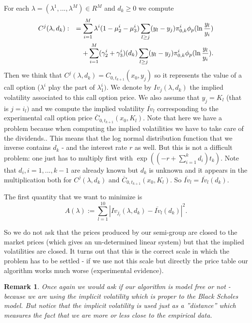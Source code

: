 \documentclass[a4paper]{article}
\newtheorem{remark}{Remark}[section]
\begin{document}
For each $\lambda =(\lambda ^{1},...,\lambda ^{M})\in R^{M}$ and $d_{k}\geq
0 $ we compute
\begin{eqnarray*}
C^{j}(\lambda ,d_{k}) &:&=\sum_{i=1}^{M}\lambda ^{i}(1-\mu _{2}^{i}-\mu
_{3}^{i})\sum_{l\geq j}(y_{l}-y_{j})\pi _{0,k}^{i}\phi _{p}(\ln \frac{y_{l}}{%
y_{i}}) \\
&&+\sum_{i=1}^{M}(\gamma _{2}^{i}+\gamma _{3}^{i})(d_{k})\sum_{l\geq
j}(y_{l}-y_{j})\pi _{0,k}^{i}\phi _{p}(\ln \frac{y_{l}}{y_{i}}).
\end{eqnarray*}
Then we think that $C^{j}(\lambda ,d_{k})=C_{0,t_{k+1}}(x_{0},y_{j})$ so it
represents the value of a call option ($\lambda ^{i}$ play the part of $%
\lambda _{1}^{i})$. We denote by $Iv_{j}(\lambda ,d_{k})$ the implied
volatility associated to this call option price. We also assume that $%
y_{j}=K_{l}$ (that is $j=i_{l})$ and we compute the implied volatility $%
\overline{Iv}_{l}$ corresponding to the experimental call option price $%
\overline{C}_{0,t_{k+1}}(x_{0},K_{l})$. Note that here we have a problem
because when computing the implied volatilities we have to take care of the
dividends.. This means that the log normal distribution function that we
inverse contains $d_{k}$ - and the interest rate $r$ as well. But this is
not a difficult problem: one just has to multiply first with $\exp
((-r+\sum_{i=1}^{k}d_{i})t_{k}).$ Note that $d_{i},i=1,...,k-1$ are already
known but $d_{k}$ is unknown and it appears in the multiplication both for $%
C^{j}(\lambda ,d_{k})$ and $\overline{C}_{0,t_{k+1}}(x_{0},K_{l}).$ So $%
\overline{Iv}_{l}=\overline{Iv}_{l}(d_{k}).$

The first quantity that we want to minimize is
\[
A(\lambda ):=\sum_{l=1}^{10}\left| Iv_{j_{l}}(\lambda ,d_{k})-\overline{Iv}%
_{l}(d_{k})\right| ^{2}.
\]

So we do not ask that the prices produced by our semi-group are closed to the
market prices (which gives an un-determined linear system) but that the
implied volatilities are closed. It turns out that this is the correct scale
in which the problem has to be settled - if we use not this scale but
directly the price table our algorithm works much worse (experimental
evidence).

\begin{remark}
Once again we would ask if our algorithm is model free or not - because we
are using the implicit volatility which is proper to the Black Scholes
model. But notice that the implicit volatility is used just as a
''distance'' which measures the fact that we are more or less close to the
empirical data.
\end{remark}
\end{document}
